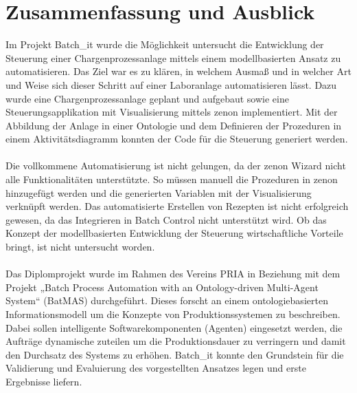 

\chapter{Zusammenfassung und Ausblick} \label{chapter:conclusion}

Im Projekt Batch\_it wurde die Möglichkeit untersucht die Entwicklung der Steuerung einer Chargenprozessanlage mittels einem modellbasierten Ansatz zu automatisieren. Das Ziel war es zu klären, in welchem Ausmaß und in welcher Art und Weise sich dieser Schritt auf einer Laboranlage automatisieren lässt. Dazu wurde eine Chargenprozessanlage geplant und aufgebaut sowie eine Steuerungsapplikation mit Visualisierung mittels zenon implementiert. 
Mit der Abbildung der Anlage in einer Ontologie und dem Definieren der Prozeduren in einem Aktivitätsdiagramm konnten der Code für die Steuerung generiert werden. \\\\
Die vollkommene Automatisierung ist nicht gelungen, da der zenon Wizard nicht alle Funktionalitäten unterstützte. So müssen manuell die Prozeduren in zenon hinzugefügt werden und die generierten Variablen mit der Visualisierung verknüpft werden. Das automatisierte Erstellen von Rezepten ist nicht erfolgreich gewesen, da das Integrieren in Batch Control nicht unterstützt wird. Ob das Konzept der modellbasierten Entwicklung der Steuerung wirtschaftliche Vorteile bringt, ist nicht untersucht worden. \\\\
Das Diplomprojekt wurde im Rahmen des Vereins PRIA in Beziehung mit dem Projekt „Batch Process Automation with an On\-to\-lo\-gy-driven Multi-Agent System“ (BatMAS) durchgeführt. Dieses forscht an einem ontologiebasierten Informationsmodell um die Konzepte von Produktionssystemen zu beschreiben. Dabei sollen intelligente Softwarekomponenten (Agenten) eingesetzt werden, die Aufträge dynamische zuteilen um die Produktionsdauer zu verringern und damit den Durchsatz des Systems zu erhöhen. Batch\_it konnte den Grundstein für die Validierung und Evaluierung des vorgestellten Ansatzes legen und erste Ergebnisse liefern.\\\\
